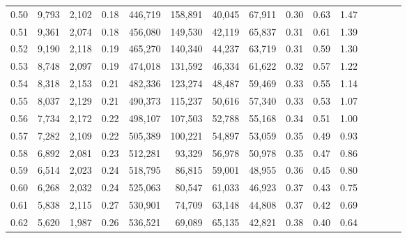 \begin{tabular}{rrrcrrrrrrrrrrr}
0.50 &   9,793 &  2,102 &                                       0.18 &  446,719 &  158,891 &   40,045 &   67,911 &  0.30 &  0.63 &                         1.47 \\
0.51 &   9,361 &  2,074 &                                       0.18 &  456,080 &  149,530 &   42,119 &   65,837 &  0.31 &  0.61 &                         1.39 \\
0.52 &   9,190 &  2,118 &                                       0.19 &  465,270 &  140,340 &   44,237 &   63,719 &  0.31 &  0.59 &                         1.30 \\
0.53 &   8,748 &  2,097 &                                       0.19 &  474,018 &  131,592 &   46,334 &   61,622 &  0.32 &  0.57 &                         1.22 \\
0.54 &   8,318 &  2,153 &                                       0.21 &  482,336 &  123,274 &   48,487 &   59,469 &  0.33 &  0.55 &                         1.14 \\
0.55 &   8,037 &  2,129 &                                       0.21 &  490,373 &  115,237 &   50,616 &   57,340 &  0.33 &  0.53 &                         1.07 \\
0.56 &   7,734 &  2,172 &                                       0.22 &  498,107 &  107,503 &   52,788 &   55,168 &  0.34 &  0.51 &                         1.00 \\
0.57 &   7,282 &  2,109 &                                       0.22 &  505,389 &  100,221 &   54,897 &   53,059 &  0.35 &  0.49 &                         0.93 \\
0.58 &   6,892 &  2,081 &                                       0.23 &  512,281 &   93,329 &   56,978 &   50,978 &  0.35 &  0.47 &                         0.86 \\
0.59 &   6,514 &  2,023 &                                       0.24 &  518,795 &   86,815 &   59,001 &   48,955 &  0.36 &  0.45 &                         0.80 \\
0.60 &   6,268 &  2,032 &                                       0.24 &  525,063 &   80,547 &   61,033 &   46,923 &  0.37 &  0.43 &                         0.75 \\
0.61 &   5,838 &  2,115 &                                       0.27 &  530,901 &   74,709 &   63,148 &   44,808 &  0.37 &  0.42 &                         0.69 \\
0.62 &   5,620 &  1,987 &                                       0.26 &  536,521 &   69,089 &   65,135 &   42,821 &  0.38 &  0.40 &                         0.64 \\

\end{tabular}
